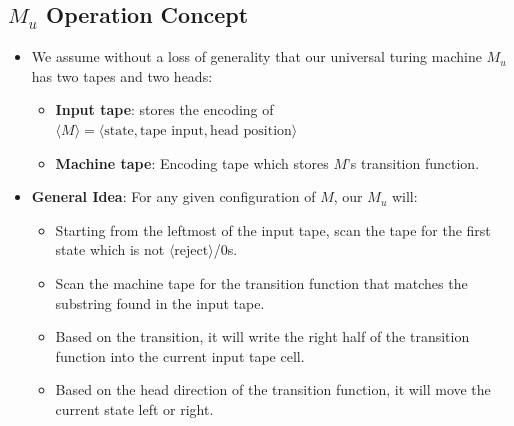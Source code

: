 \documentclass[12pt]{article}
\begin{document}
\subsection{$M_u$ Operation Concept}
\begin{itemize}
    \item We assume without a loss of generality that our universal turing machine $M_u$ has two tapes and two heads:
    \begin{itemize}
        \item \textbf{Input tape}: stores the encoding of $\langle M \rangle = \langle \text{state}, \text{tape input}, \text{head position} \rangle$
        \item \textbf{Machine tape}: Encoding tape which stores $M$'s transition function.
    \end{itemize}
    \item \textbf{General Idea}: For any given configuration of $M$, our $M_u$ will:
    \begin{itemize}
        \item Starting from the leftmost of the input tape, scan the tape for the first state which is not $\langle \text{reject} \rangle$/$0$s.
        \item Scan the machine tape for the transition function that matches the substring found in the input tape.
        \item Based on the transition, it will write the right half of the transition function into the current input tape cell.
        \item Based on the head direction of the transition function, it will move the current state left or right.
    \end{itemize}
\end{itemize}
\end{document}
